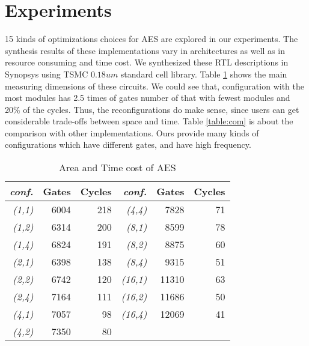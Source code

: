 \section{Experiments}\label{sec:experiments}
15 kinds of optimizations choices for AES are explored in our experiments. The synthesis results of these implementations vary in architectures as well as in resource consuming and time cost. We synthesized these RTL descriptions in Synopsys using TSMC $0.18um$ standard cell library. Table \ref{xxxx} shows the main measuring dimensions of these circuits. We could see that, configuration with the most modules has 2.5 times of gates number of that with fewest modules and 20\% of the cycles. Thus, the reconfigurations do make sense, since users can get considerable trade-offs between space and time. Table \ref{table:com} is about the comparison with other implementations. Ours provide many kinds of configurations which have different gates, and have high frequency.
\begin{table}[h]
\centering
\caption{Area and Time cost of AES}
\begin{tabular}{|r|rr||r|rr|} \hline
\textit{conf.} & Gates & Cycles & \textit{conf.} & Gates & Cycles\\ \hline
\textit{(1,1)} & 6004 & 218 & \textit{(4,4)} & 7828 & 71 \\
\textit{(1,2)} & 6314 & 200 & \textit{(8,1)} & 8599 & 78 \\
\textit{(1,4)} & 6824 & 191 & \textit{(8,2)} & 8875 & 60 \\
\textit{(2,1)} & 6398 & 138 & \textit{(8,4)} & 9315 & 51 \\
\textit{(2,2)} & 6742 & 120 & \textit{(16,1)} & 11310 & 63 \\
\textit{(2,4)} & 7164 & 111 & \textit{(16,2)} & 11686 & 50 \\
\textit{(4,1)} & 7057 & 98 & \textit{(16,4)} &12069 & 41 \\ \cline{4-6}
\textit{(4,2)} & 7350 & 80 & \multicolumn{3}{c|}{} \\ \hline
\end{tabular}
\label{xxxx}
\end{table}
